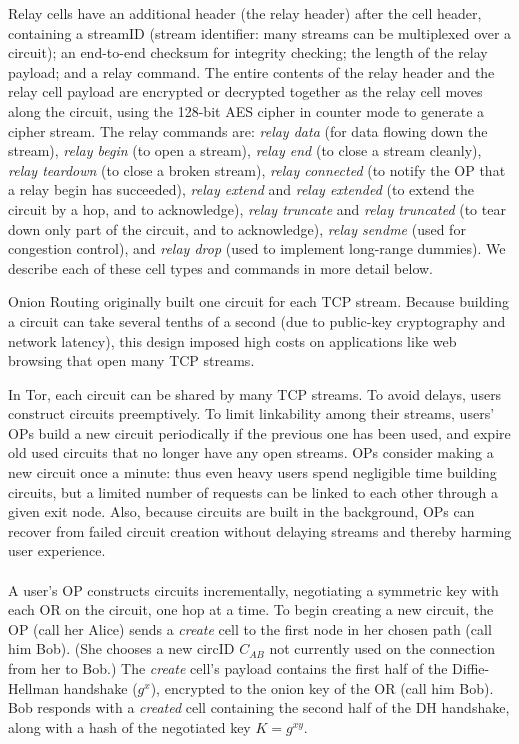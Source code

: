 \documentclass[times,10pt,twocolumn]{article}
\begin{document}
Relay cells have an additional header (the relay header) after the
cell header, containing a streamID (stream identifier: many streams can
be multiplexed over a circuit); an end-to-end checksum for integrity
checking; the length of the relay payload; and a relay command.
The entire contents of the relay header and the relay cell payload
are encrypted or decrypted together as the relay cell moves along the
circuit, using the 128-bit AES cipher in counter mode to generate a
cipher stream.
The
relay commands are: \emph{relay
data} (for data flowing down the stream), \emph{relay begin} (to open a
stream), \emph{relay end} (to close a stream cleanly), \emph{relay
teardown} (to close a broken stream), \emph{relay connected}
(to notify the OP that a relay begin has succeeded), \emph{relay
extend} and \emph{relay extended} (to extend the circuit by a hop,
and to acknowledge), \emph{relay truncate} and \emph{relay truncated}
(to tear down only part of the circuit, and to acknowledge), \emph{relay
sendme} (used for congestion control), and \emph{relay drop} (used to
implement long-range dummies).
We describe each of these cell types and commands in more detail below.

\label{subsec:circuits}

Onion Routing originally built one circuit for each
TCP stream.  Because building a circuit can take several tenths of a
second (due to public-key cryptography and network latency),
this design imposed high costs on applications like web browsing that
open many TCP streams.

In Tor, each circuit can be shared by many TCP streams.  To avoid
delays, users construct circuits preemptively.  To limit linkability
among their streams, users' OPs build a new circuit
periodically if the previous one has been used,
and expire old used circuits that no longer have any open streams.
OPs consider making a new circuit once a minute: thus
even heavy users spend negligible time
building circuits, but a limited number of requests can be linked
to each other through a given exit node. Also, because circuits are built
in the background, OPs can recover from failed circuit creation
without delaying streams and thereby harming user experience.\\

\label{subsubsec:constructing-a-circuit}\\
A user's OP constructs circuits incrementally, negotiating a
symmetric key with each OR on the circuit, one hop at a time. To begin
creating a new circuit, the OP (call her Alice) sends a
\emph{create} cell to the first node in her chosen path (call him Bob).
(She chooses a new
circID $C_{AB}$ not currently used on the connection from her to Bob.)
The \emph{create} cell's
payload contains the first half of the Diffie-Hellman handshake
($g^x$), encrypted to the onion key of the OR (call him Bob). Bob
responds with a \emph{created} cell containing the second half of the
DH handshake, along with a hash of the negotiated key $K=g^{xy}$.
\end{document}
